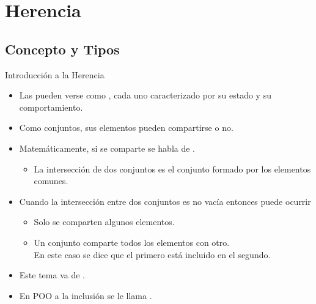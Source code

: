 \documentclass[10pt,envcountsect,spanish]{beamer}
\begin{document}
\section{Herencia}

\subsection{Concepto y Tipos}


\begin{frame}{Introducción a la Herencia} \large

\begin{itemize}
\item Las  pueden verse como , cada uno caracterizado por su estado y su comportamiento.

\item Como conjuntos, sus elementos pueden compartirse o no.

\item Matemáticamente, si se comparte se habla de .

\begin{itemize} \normalsize
\item La intersección de dos conjuntos es el conjunto formado por los elementos comunes.
\end{itemize}

\item Cuando la intersección entre dos conjuntos es no vacía entonces puede ocurrir
\begin{itemize} \normalsize
\item Solo se comparten algunos elementos.
\item Un conjunto comparte todos los elementos con otro. \\
	En este caso se dice que el primero está incluido en el segundo.
\end{itemize}

\item Este tema va de .

\item En POO a la inclusión se le llama .
\end{itemize}
\end{frame}
\end{document}
